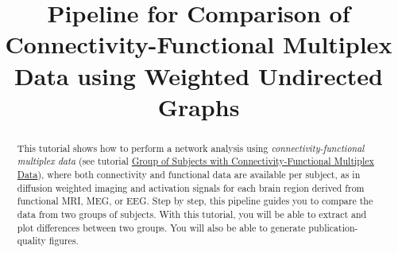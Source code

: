\documentclass[justified]{tufte-handout}
\title[Comparison of Connectivity-Functional Multiplex Data using WU]{Pipeline for Comparison of Connectivity-Functional Multiplex Data using Weighted Undirected Graphs}
\begin{document}
\maketitle

\begin{abstract}
\noindent
This tutorial shows how to perform a network analysis using \emph{connectivity-functional multiplex data} (see tutorial \href{https://github.com/braph-software/BRAPH-2/tree/develop/tutorials/data/tut_gr_con_fun_mp}{Group of Subjects with Connectivity-Functional Multiplex Data}), where both connectivity and functional data are available per subject, as in diffusion weighted imaging and activation signals for each brain region derived from functional MRI, MEG, or EEG. Step by step, this pipeline guides you to compare the data from two groups of subjects.  With this tutorial, you will be able to extract and plot differences between two groups. You will also be able to generate publication-quality figures.
\end{abstract}
\end{document}
